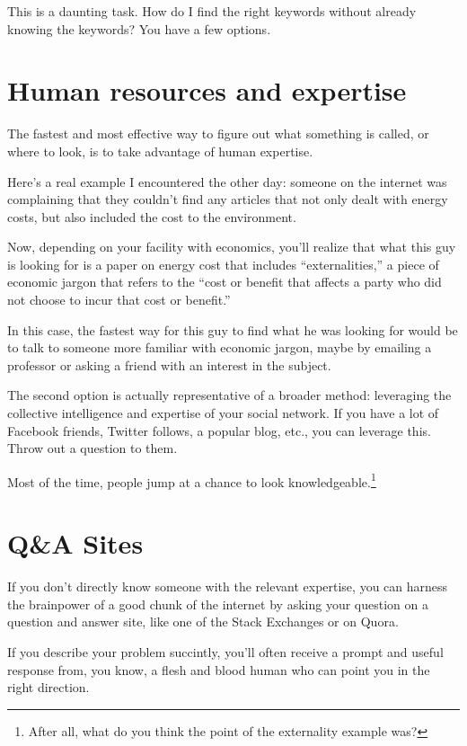 This is a daunting task. How do I find the right keywords without already
knowing the keywords? You have a few options.

\section{Human resources and expertise}

The fastest and most effective way to figure out what something is called, or
where to look, is to take advantage of human expertise.

Here's a real example I encountered the other day: someone on the internet was
complaining that they couldn't find any articles that not only dealt with energy
costs, but also included the cost to the environment.

Now, depending on your facility with economics, you'll realize that what this
guy is looking for is a paper on energy cost that includes ``externalities,'' a
piece of economic jargon that refers to the ``cost or benefit that affects a
party who did not choose to incur that cost or benefit.''

In this case, the fastest way for this guy to find what he was looking for would
be to talk to someone more familiar with economic jargon, maybe by emailing a
professor or asking a friend with an interest in the subject.

The second option is actually representative of a broader method: leveraging the
collective intelligence and expertise of your social network. If you have a lot
of Facebook friends, Twitter follows, a popular blog, etc., you can leverage
this. Throw out a question to them.

Most of the time, people jump at a chance to look knowledgeable.\footnote{After
  all, what do you think the point of the externality example was?}

\section{Q\&A Sites}

If you don't directly know someone with the relevant expertise, you can harness
the brainpower of a good chunk of the internet by asking your question on a
question and answer site, like one of the Stack Exchanges or on Quora.

If you describe your problem succintly, you'll often receive a prompt and useful
response from, you know, a flesh and blood human who can point you in the right
direction.

